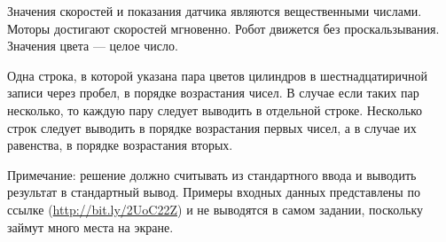 Значения скоростей и показания датчика являются вещественными числами. Моторы достигают скоростей мгновенно. Робот движется без проскальзывания. Значения цвета --- целое число.

\outputfmtSection

Одна строка, в которой указана пара цветов цилиндров в шестнадцатиричной записи через пробел, в порядке возрастания чисел. В случае если таких пар несколько, то каждую пару следует выводить в отдельной строке. Несколько строк следует выводить в порядке возрастания первых чисел, а в случае их равенства, в порядке возрастания вторых.

Примечание: решение должно считывать из стандартного ввода и выводить результат в стандартный вывод. 
Примеры входных данных представлены по ссылке (\url{http://bit.ly/2UoC22Z}) и не выводятся в самом задании, поскольку займут много места на экране.

